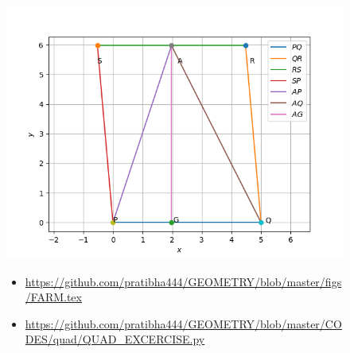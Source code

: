 \begin{frame}
\begin{figure}
\includegraphics[scale=.5]{./CODES/quad/QUADCON.png}\\
\begin{itemize}
\item \url{https://github.com/pratibha444/GEOMETRY/blob/master/figs/FARM.tex}\\
\item \url{https://github.com/pratibha444/GEOMETRY/blob/master/CODES/quad/QUAD_EXCERCISE.py}
\end{itemize}
\end{figure}
\end{frame}
